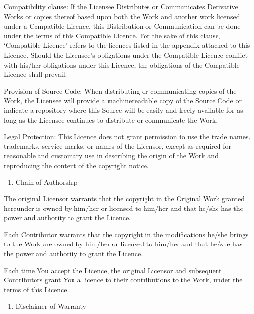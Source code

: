 \documentclass[letterpaper,10pt,english]{sphinxmanual}
\begin{document}
\sphinxAtStartPar
Compatibility clause: If the Licensee Distributes or Communicates Derivative
Works or copies thereof based upon both the Work and another work licensed under
a Compatible Licence, this Distribution or Communication can be done under the
terms of this Compatible Licence. For the sake of this clause, ‘Compatible
Licence’ refers to the licences listed in the appendix attached to this Licence.
Should the Licensee’s obligations under the Compatible Licence conflict with
his/her obligations under this Licence, the obligations of the Compatible
Licence shall prevail.

\sphinxAtStartPar
Provision of Source Code: When distributing or communicating copies of the Work,
the Licensee will provide a machine\sphinxhyphen{}readable copy of the Source Code or indicate
a repository where this Source will be easily and freely available for as long
as the Licensee continues to distribute or communicate the Work.

\sphinxAtStartPar
Legal Protection: This Licence does not grant permission to use the trade names,
trademarks, service marks, or names of the Licensor, except as required for
reasonable and customary use in describing the origin of the Work and
reproducing the content of the copyright notice.
\begin{enumerate}
%
\setcounter{enumi}{5}
\item {} 
\sphinxAtStartPar
Chain of Authorship

\end{enumerate}

\sphinxAtStartPar
The original Licensor warrants that the copyright in the Original Work granted
hereunder is owned by him/her or licensed to him/her and that he/she has the
power and authority to grant the Licence.

\sphinxAtStartPar
Each Contributor warrants that the copyright in the modifications he/she brings
to the Work are owned by him/her or licensed to him/her and that he/she has the
power and authority to grant the Licence.

\sphinxAtStartPar
Each time You accept the Licence, the original Licensor and subsequent
Contributors grant You a licence to their contributions to the Work, under the
terms of this Licence.
\begin{enumerate}
%
\setcounter{enumi}{6}
\item {} 
\sphinxAtStartPar
Disclaimer of Warranty

\end{enumerate}
\end{document}
